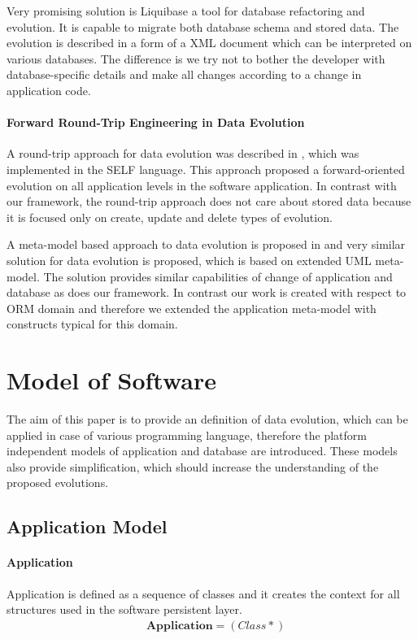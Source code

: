 \documentclass[11pt]{article}
\begin{document}
Very promising solution is Liquibase \cite{Liquibase} a tool for database refactoring and evolution. It is capable to migrate both database schema and stored data. The evolution is described in a form of a XML document which can be interpreted on various databases. The difference is we try not to bother the developer with database-specific details and make all changes according to a change in application code. 


\paragraph{Forward Round-Trip Engineering in Data Evolution} A round-trip approach for data evolution was described in \cite{VanPaesschen:2005to}, which was implemented in the SELF language. This approach proposed a forward-oriented evolution on all application levels in the software application. In contrast with our framework, the round-trip approach does not care about stored data because it is focused only on create, update and delete types of evolution.

A meta-model based approach to data evolution is proposed in\cite{Aboulsamh:MetaModelBasedApproachToIsDataEvolution} and very similar solution for data evolution is proposed, which is based on extended UML meta-model. The solution provides similar capabilities of change of application and database as does our framework. In contrast our work is created with respect to ORM domain and therefore we extended the application meta-model with constructs typical for this domain.

\section{Model of Software}
\label{sec:models}
The aim of this paper is to provide an definition of data evolution, which can be applied in case of various programming language, therefore the platform independent models of application and database are introduced. These models also provide simplification, which should increase the understanding of the proposed evolutions.

\subsection{Application Model}
\paragraph{Application} Application is defined as a sequence of classes and it creates the context for all structures used in the software persistent layer.
\begin{align*}
& \mathbf{Application} = (Class*)
\end{align*}
\end{document}
